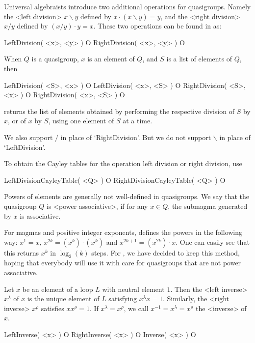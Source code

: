 Universal algebraists introduce two additional operations for quasigroups.
Namely the <left division> $x\backslash y$ defined by
$x\cdot(x\backslash y)=y$, and the <right division> $x/y$
defined by $(x/y)\cdot y=x$. These two operations can be found in {\LOOPS} as:

\>LeftDivision( <x>, <y> ) O
\>RightDivision( <x>, <y> ) O

When $Q$ is a quasigroup, $x$ is an element of $Q$, and $S$ is a list of
elements of $Q$, then

\>LeftDivision( <S>, <x> ) O
\>LeftDivision( <x>, <S> ) O
\>RightDivision( <S>, <x> ) O
\>RightDivision( <x>, <S> ) O

returns the list of elements obtained by performing the respective
division of $S$ by $x$, or of $x$ by $S$, using one element of $S$ at a time.

We also support $/$ in place of `RightDivision'. But we do not support
$\backslash$ in place of `LeftDivision'.

To obtain the Cayley tables for the operation left division or
right division, use

\>LeftDivisionCayleyTable( <Q> ) O
\>RightDivisionCayleyTable( <Q> ) O


Powers of elements are generally not well-defined in quasigroups. We say that
the quasigroup $Q$ is <power associative>, if for any $x\in
Q$, the submagma generated by $x$ is associative.

For magmas and positive integer exponents, {\GAP} defines the powers in the
following way: $x^1=x$, $x^{2k}=(x^k)\cdot(x^k)$ and $x^{2k+1}=(x^{2k})\cdot
x$. One can easily see that this returns $x^k$ in $\log_2(k)$ steps. For
{\LOOPS}, we have decided to keep this method, hoping that everybody will use
it with care for quasigroups that are not power associative.

Let $x$ be an element of a loop $L$ with neutral element $1$. Then the <left
inverse> $x^\lambda$ of $x$ is the unique element of $L$
satisfying $x^\lambda x=1$. Similarly, the <right inverse>
$x^\rho$ satisfies $xx^\rho=1$. If $x^\lambda=x^\rho$, we call
$x^{-1}=x^\lambda=x^\rho$ the <inverse> of $x$.

\>LeftInverse( <x> ) O
\>RightInverse( <x> ) O
\>Inverse( <x> ) O

